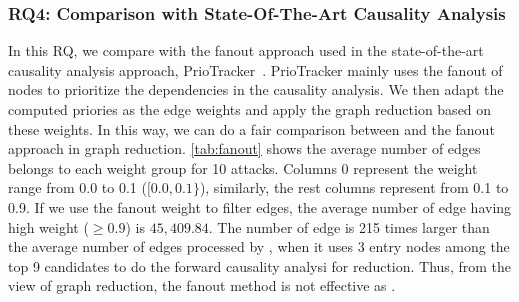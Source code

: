 
\subsubsection{RQ4: Comparison with State-Of-The-Art Causality Analysis}
In this RQ, we compare \tool with the fanout approach used in the state-of-the-art causality analysis approach, PrioTracker~\cite{liu2018priotracker}. 
PrioTracker mainly uses the fanout of nodes to prioritize the dependencies in the causality analysis. 
We then adapt the computed priories as the edge weights and apply the graph reduction based on these weights. 
In this way, we can do a fair comparison between \tool and the fanout approach in graph reduction.
\cref{tab:fanout} shows the average number of edges belongs to each weight group for 10 attacks. 
Columns 0 represent the weight range from 0.0 to 0.1 (\ie $[0.0, 0.1\}$), similarly, the rest columns represent from 0.1 to 0.9. 
If we use the fanout weight to filter edges, the average number of edge having high weight (\ie $\ge 0.9$) is $45,409.84$. 
The number of edge is 215 times larger than the average number of edges processed by \tool, when it uses 3 entry nodes among the top 9 candidates to do the forward causality analysi for reduction. 
Thus, from the view of graph reduction, the fanout method is not effective as \tool.
